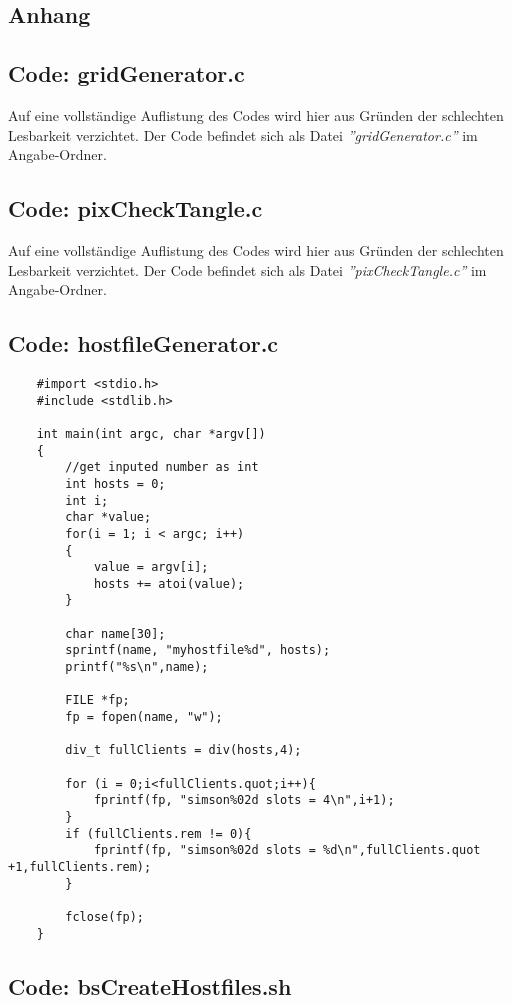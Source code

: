 \documentclass[
10pt, %
a4paper, %
oneside, %
headinclude,footinclude, %
BCOR5mm, %
]{scrartcl}
\begin{document}
\begin{appendix} 
	\clearpage 
	\section{Anhang}
	\subsection{Code: gridGenerator.c}
	Auf eine vollständige Auflistung des Codes wird hier aus Gründen der schlechten Lesbarkeit verzichtet. Der Code befindet sich als Datei \textit{''gridGenerator.c'' }im Angabe-Ordner.
	
	\subsection{Code: pixCheckTangle.c}
	Auf eine vollständige Auflistung des Codes wird hier aus Gründen der schlechten Lesbarkeit verzichtet. Der Code befindet sich als Datei \textit{''pixCheckTangle.c'' }im Angabe-Ordner.

	\subsection{Code: hostfileGenerator.c}
	
	\begin{lstlisting}
	#import <stdio.h>
	#include <stdlib.h>
	
	int main(int argc, char *argv[])
	{
		//get inputed number as int
		int hosts = 0;
		int i;
		char *value;
		for(i = 1; i < argc; i++)
		{
			value = argv[i];
			hosts += atoi(value);
		}
	
		char name[30]; 
		sprintf(name, "myhostfile%d", hosts);
		printf("%s\n",name);
	
		FILE *fp;
		fp = fopen(name, "w");

		div_t fullClients = div(hosts,4);
	
		for (i = 0;i<fullClients.quot;i++){
			fprintf(fp, "simson%02d slots = 4\n",i+1);
		}
		if (fullClients.rem != 0){
			fprintf(fp, "simson%02d slots = %d\n",fullClients.quot +1,fullClients.rem);
		}

		fclose(fp);
	}
\end{lstlisting}
	
	\subsection{Code: bsCreateHostfiles.sh}			
	
	
	

\end{appendix}
\end{document}
